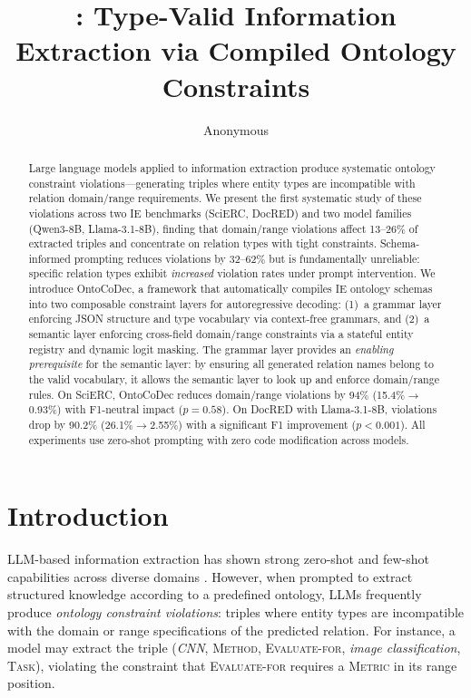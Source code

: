 \documentclass[11pt,a4paper]{article}
\title{\sys{}: Type-Valid Information Extraction via Compiled Ontology Constraints}
\author{Anonymous}
\newcommand{\sys}{OntoCoDec}
\begin{document}
\maketitle

\begin{abstract}
Large language models applied to information extraction produce systematic ontology constraint violations---generating triples where entity types are incompatible with relation domain/range requirements.
We present the first systematic study of these violations across two IE benchmarks (SciERC, DocRED) and two model families (Qwen3-8B, Llama-3.1-8B), finding that domain/range violations affect 13--26\% of extracted triples and concentrate on relation types with tight constraints.
Schema-informed prompting reduces violations by 32--62\% but is fundamentally unreliable: specific relation types exhibit \emph{increased} violation rates under prompt intervention.
We introduce \sys{}, a framework that automatically compiles IE ontology schemas into two composable constraint layers for autoregressive decoding: (1)~a grammar layer enforcing JSON structure and type vocabulary via context-free grammars, and (2)~a semantic layer enforcing cross-field domain/range constraints via a stateful entity registry and dynamic logit masking.
The grammar layer provides an \emph{enabling prerequisite} for the semantic layer: by ensuring all generated relation names belong to the valid vocabulary, it allows the semantic layer to look up and enforce domain/range rules.
On SciERC, \sys{} reduces domain/range violations by 94\% (15.4\%$\to$0.93\%) with F1-neutral impact ($p{=}0.58$).
On DocRED with Llama-3.1-8B, violations drop by 90.2\% (26.1\%$\to$2.55\%) with a significant F1 improvement ($p{<}0.001$).
All experiments use zero-shot prompting with zero code modification across models.
\end{abstract}

\section{Introduction}

LLM-based information extraction has shown strong zero-shot and few-shot capabilities across diverse domains \cite{Wei2023ZeroShotIE,Wadhwa2023Revisiting}.
However, when prompted to extract structured knowledge according to a predefined ontology, LLMs frequently produce \emph{ontology constraint violations}: triples where entity types are incompatible with the domain or range specifications of the predicted relation.
For instance, a model may extract the triple (\textit{CNN}, \textsc{Method}, \textsc{Evaluate-for}, \textit{image classification}, \textsc{Task}), violating the constraint that \textsc{Evaluate-for} requires a \textsc{Metric} in its range position.
\end{document}
